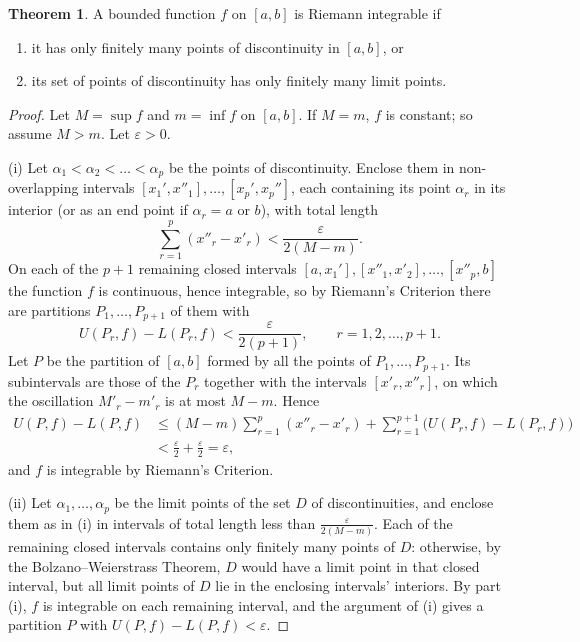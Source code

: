 \documentclass[11pt,a4paper]{article}
\numberwithin{equation}{section}
\theoremstyle{definition}
\newtheorem{thm}{Theorem}[subsection]
\begin{document}
\begin{thm}
A bounded function $f$ on $[a,b]$ is Riemann integrable if
\begin{enumerate}
\item[(i)] it has only finitely many points of discontinuity in $[a,b]$, or
\item[(ii)] its set of points of discontinuity has only finitely many limit points.
\end{enumerate}
\end{thm}

\begin{proof}
Let $M = \sup f$ and $m = \inf f$ on $[a,b]$. If $M = m$, $f$ is constant; so assume $M>m$. Let $\varepsilon>0$.

(i) Let $\alpha_1<\alpha_2<\dots<\alpha_p$ be the points of discontinuity. Enclose them in non-overlapping intervals $[x_1', x''_1], \dots, [x_p',x_p'']$, each containing its point $\alpha_r$ in its interior (or as an end point if $\alpha_r = a$ or $b$), with total length
$$\sum^p_{r = 1}(x''_r - x'_r) < \frac{\varepsilon}{2(M - m)} .$$
On each of the $p + 1$ remaining closed intervals $[a,x_1'], [x''_1,x'_2], \dots, [x''_p,b]$ the function $f$ is continuous, hence integrable, so by Riemann's Criterion there are partitions $P_1, \dots, P_{p+1}$ of them with
$$U(P_r,f) - L(P_r,f) < \frac{\varepsilon}{2(p+1)}, \qquad r =1, 2, \dots, p + 1 .$$
Let $P$ be the partition of $[a,b]$ formed by all the points of $P_1,\dots,P_{p+1}$. Its subintervals are those of the $P_r$ together with the intervals $[x'_r,x''_r]$, on which the oscillation $M'_r - m'_r$ is at most $M - m$. Hence
\begin{align*}
U(P,f) - L(P,f) &\leq (M-m)\sum^p_{r=1}(x''_r-x'_r) + \sum^{p + 1}_{r=1}\bigl(U(P_r,f) - L(P_r,f)\bigr)\\
&< \frac{\varepsilon}{2} + \frac{\varepsilon}{2} = \varepsilon,
\end{align*}
and $f$ is integrable by Riemann's Criterion.

(ii) Let $\alpha_1,\dots,\alpha_p$ be the limit points of the set $D$ of discontinuities, and enclose them as in (i) in intervals of total length less than $\frac{\varepsilon}{2(M-m)}$. Each of the remaining closed intervals contains only finitely many points of $D$: otherwise, by the Bolzano--Weierstrass Theorem, $D$ would have a limit point in that closed interval, but all limit points of $D$ lie in the enclosing intervals' interiors. By part (i), $f$ is integrable on each remaining interval, and the argument of (i) gives a partition $P$ with $U(P,f) - L(P,f) < \varepsilon$.
\end{proof}
\end{document}
